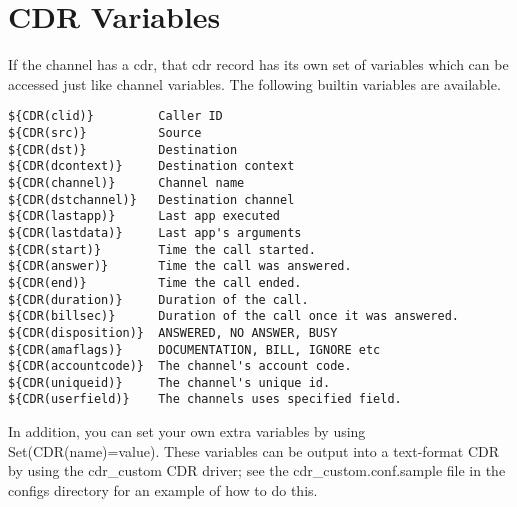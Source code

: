 \section{CDR Variables}

If the channel has a cdr, that cdr record has its own set of variables which
can be accessed just like channel variables. The following builtin variables
are available.

\begin{verbatim}
${CDR(clid)}         Caller ID
${CDR(src)}          Source
${CDR(dst)}          Destination
${CDR(dcontext)}     Destination context
${CDR(channel)}      Channel name
${CDR(dstchannel)}   Destination channel
${CDR(lastapp)}      Last app executed
${CDR(lastdata)}     Last app's arguments
${CDR(start)}        Time the call started.
${CDR(answer)}       Time the call was answered.
${CDR(end)}          Time the call ended.
${CDR(duration)}     Duration of the call.
${CDR(billsec)}      Duration of the call once it was answered.
${CDR(disposition)}  ANSWERED, NO ANSWER, BUSY
${CDR(amaflags)}     DOCUMENTATION, BILL, IGNORE etc
${CDR(accountcode)}  The channel's account code.
${CDR(uniqueid)}     The channel's unique id.
${CDR(userfield)}    The channels uses specified field.
\end{verbatim}

In addition, you can set your own extra variables by using Set(CDR(name)=value).
These variables can be output into a text-format CDR by using the cdr\_custom
CDR driver; see the cdr\_custom.conf.sample file in the configs directory for
an example of how to do this.
